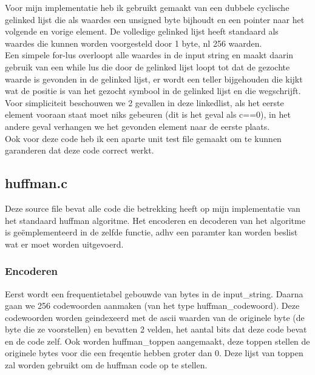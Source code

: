 \documentclass[10pt,a4paper]{report}
\begin{document}
Voor mijn implementatie heb ik gebruikt gemaakt van een dubbele cyclische gelinked lijst die als waardes een unsigned byte bijhoudt en een pointer naar het volgende en vorige element. De volledige  gelinked lijst heeft standaard als waardes die kunnen worden voorgesteld door 1 byte, nl 256 waarden.\\ 
Een simpele for-lus overloopt alle waardes in de input string en maakt daarin gebruik van een while lus die door de gelinked lijst loopt tot dat de gezochte waarde is gevonden in de gelinked lijst, er wordt een teller bijgehouden die kijkt wat de positie is van het gezocht symbool in de gelinked lijst en die wegschrijft.\\

Voor simpliciteit beschouwen we 2 gevallen in deze linkedlist, als het eerste element vooraan staat moet niks gebeuren (dit is het geval als c==0), in het andere geval verhangen we het gevonden element naar de eerste plaats.\\

Ook voor deze code heb ik een aparte unit test file gemaakt om te kunnen garanderen dat deze code correct werkt. 
\subsection*{huffman.c}
Deze source file bevat alle code die betrekking heeft op mijn implementatie van het standaard huffman algoritme. Het encoderen en decoderen van het algoritme is  ge\"emplementeerd in de zelfde functie, adhv een paramter kan worden beslist wat er moet worden uitgevoerd. \\

\subsubsection*{Encoderen}
Eerst wordt een frequentietabel gebouwde van bytes in de input\_string. Daarna gaan we 256 codewoorden aanmaken (van het type huffman\_codewoord). Deze codewoorden worden geindexeerd met de ascii waarden van de originele byte (de byte die ze voorstellen) en bevatten 2 velden, het aantal bits dat deze code bevat en de code zelf. Ook worden huffman\_toppen aangemaakt, deze toppen stellen de originele bytes voor die een freqentie hebben groter dan 0. Deze lijst van toppen zal worden gebruikt om de huffman code op te stellen. \\
\end{document}
